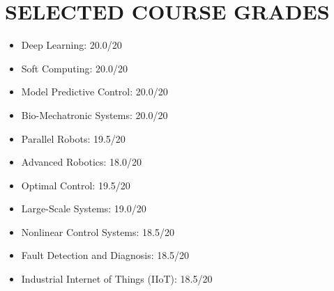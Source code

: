 \documentclass[11pt,a4paper,sans]{moderncv} %
\begin{document}
 \section{SELECTED COURSE GRADES}
	
\begin{cvcolumns}
    {
        \begin{itemize}
            \item \href{https://ut.ac.ir/en}{} Deep Learning: 20.0/20
            \item \href{https://en.kntu.ac.ir/}{} Soft Computing: 20.0/20
            \item \href{https://en.kntu.ac.ir/}{} Model Predictive Control: 20.0/20
            \item \href{https://en.kntu.ac.ir/}{} Bio-Mechatronic Systems: 20.0/20
            \item \href{https://en.kntu.ac.ir/}{} Parallel Robots: 19.5/20
            \item \href{https://aut.ac.ir/en}{} Advanced Robotics: 18.0/20
            \item \href{https://en.kntu.ac.ir/}{} Optimal Control: 19.5/20
            \item \href{https://en.kntu.ac.ir/}{} Large-Scale Systems: 19.0/20
            \item \href{https://en.kntu.ac.ir/}{} Nonlinear Control Systems: 18.5/20
            \item \href{https://en.kntu.ac.ir/}{} Fault Detection and Diagnosis: 18.5/20
            \item \href{https://aut.ac.ir/en}{} Industrial Internet of Things (IIoT): 18.5/20
        \end{itemize}
    }
    

\end{cvcolumns}
\end{document}
